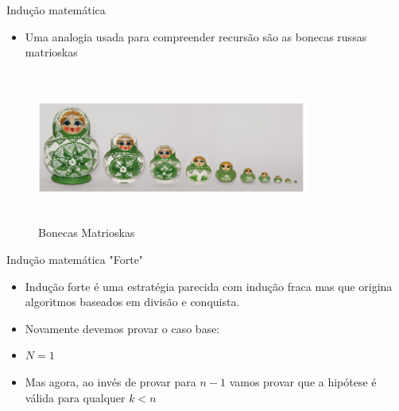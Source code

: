 \begin{frame}
	\begin{block}{Indução matemática}
		\begin{itemize}
			\item Uma analogia usada para compreender recursão são as bonecas russas matrioskas
		\end{itemize}
		 \begin{figure}[!htb]
			\centering	  				
			\includegraphics[height=5cm, width = 9cm]{./pic/nmatrioskas.png}
			\caption{Bonecas Matrioskas}
			\label{fig_matrioskas}
		\end{figure}
	\end{block}
\end{frame}

\begin{frame}
	\begin{block}{Indução matemática "Forte"}
		\begin{itemize}
			\item Indução forte é uma estratégia parecida com indução fraca mas que origina algoritmos baseados em divisão e conquista.

			\item Novamente devemos provar o caso base:
			
			\item $N = 1$
			
			\item Mas agora, ao invés de provar para $n-1$ vamos provar que a hipótese é válida para qualquer $k<n$
		\end{itemize}
	\end{block}
\end{frame}

